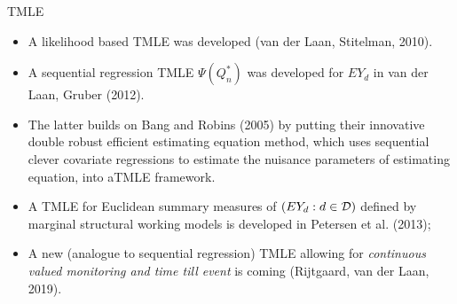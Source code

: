 \documentclass[t]{beamer}
\begin{document}


\begin{frame}{TMLE}
\begin{itemize}
\item A likelihood based TMLE was developed (van der Laan, Stitelman, 2010).
\item A sequential regression TMLE $\Psi(Q_n^*)$ was developed for $EY_d$ in van der Laan, Gruber (2012).
\item The latter builds on Bang and Robins (2005) by   putting their innovative double robust efficient estimating equation method, which uses sequential clever covariate regressions to estimate the nuisance parameters of estimating equation, into  aTMLE framework.
\item A TMLE for Euclidean summary measures of $(EY_d:d\in {\cal D})$ defined by marginal structural working models
is developed  in Petersen et al. (2013);
  \item A new (analogue to sequential regression) TMLE allowing for {\em continuous valued monitoring and time till event} is coming (Rijtgaard, van der Laan, 2019).
 \end{itemize}
 \end{frame}
\end{document}

